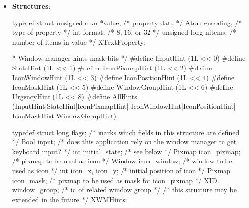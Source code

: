 \documentclass{report}
\begin{document}
    \pagebreak 
    \begin{itemize}
        \item \textbf{Structures}:
            \begin{cppcode}
                typedef struct {
                    unsigned char *value;       /* property data */
                    Atom encoding;              /* type of property */
                    int format;                 /* 8, 16, or 32 */
                    unsigned long nitems;       /* number of items in value */
                } XTextProperty;
            \end{cppcode}
            \begin{cppcode}
                * Window manager hints mask bits */
                #define InputHint               (1L << 0)
                #define StateHint               (1L << 1)
                #define IconPixmapHint          (1L << 2)
                #define IconWindowHint          (1L << 3)
                #define IconPositionHint        (1L << 4)
                #define IconMaskHint            (1L << 5)
                #define WindowGroupHint         (1L << 6)
                #define UrgencyHint             (1L << 8)
                #define AllHints                (InputHint|StateHint|IconPixmapHint|
                                                IconWindowHint|IconPositionHint|
                                                IconMaskHint|WindowGroupHint)
            \end{cppcode}
            \begin{cppcode}
                typedef struct {
                    long flags;                 /* marks which fields in this structure are defined */
                    Bool input;                 /* does this application rely on the window manager to get keyboard input? */
                    int initial_state;          /* see below */
                    Pixmap icon_pixmap;         /* pixmap to be used as icon */
                    Window icon_window;         /* window to be used as icon */
                    int icon_x, icon_y;         /* initial position of icon */
                    Pixmap icon_mask;           /* pixmap to be used as mask for icon_pixmap */
                    XID window_group;           /* id of related window group */
                    /* this structure may be extended in the future */
                } XWMHints;
            \end{cppcode}
            \begin{cppcode}

\end{cppcode}
\end{itemize}
\end{document}
